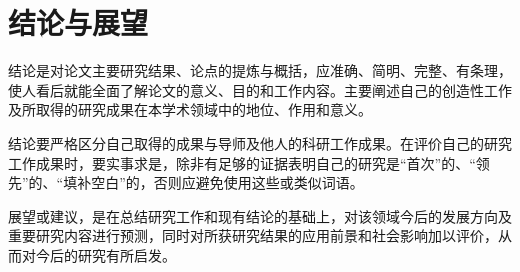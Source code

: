\chapter{结论与展望}
结论是对论文主要研究结果、论点的提炼与概括，应准确、简明、完整、有条理，使人看后就能全面了解论文的意义、目的和工作内容。主要阐述自己的创造性工作及所取得的研究成果在本学术领域中的地位、作用和意义。

结论要严格区分自己取得的成果与导师及他人的科研工作成果。在评价自己的研究工作成果时，要实事求是，除非有足够的证据表明自己的研究是“首次”的、“领先”的、“填补空白”的，否则应避免使用这些或类似词语。 

展望或建议，是在总结研究工作和现有结论的基础上，对该领域今后的发展方向及重要研究内容进行预测，同时对所获研究结果的应用前景和社会影响加以评价，从而对今后的研究有所启发。